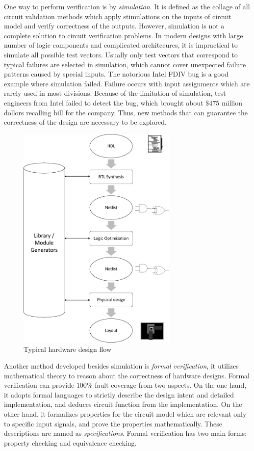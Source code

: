 One way to perform verification is by {\it simulation}. It is defined as the collage of all circuit validation 
methods which apply stimulations on the inputs of circuit model and verify correctness of the outputs.
However, simulation is not a complete solution to circuit verification problems. In modern designs with 
large number of logic components and complicated architecures, it is impractical to simulate all possible 
test vectors. Usually only test vectors that correspond to typical failures are selected in simulation, which 
cannot cover unexpected failure patterns caused by special inputs. The notorious Intel FDIV bug \cite{nicely:FDIV}
is a good example where simulation failed. Failure occurs with input assignments which are rarely used in most divisions. Because of the limitation of simulation,  
test engineers from Intel failed to detect the bug,  which brought about $\$475$ million dollors recalling bill
for the company. Thus,  new methods that can guarantee the correctness of the design are necessary to be explored.

{
\begin{figure}[h]
\centerline{
\includegraphics[width=0.7\textwidth]{newfig/designflow.eps}
}
\caption{Typical hardware design flow}
\label{fig:designflow}
\end{figure}
}

Another method developed besides simulation is \emph{formal verification}, it utilizes 
mathematical theory to reason about the correctness of hardware designs.
Formal verification can provide $100\%$ fault coverage from two aspects. On the one hand,  
it adopts formal languages to strictly describe the design intent and detailed implementation, 
and deduces circuit function from the implementation.
On the other hand,  it formalizes properties
for the circuit model which are relevant only to specific input signals,  and prove the properties mathematically. 
These descriptions are named as {\it specifications}.
Formal verification has two main forms: property checking and equivalence 
checking. 

